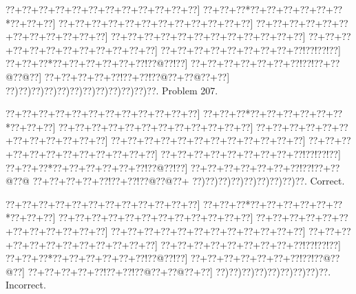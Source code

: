 \documentclass[a5paper]{article}
\begin{document}
\begin{center}
{\goo
\0??+\0??+\0??+\0??+\0??+\0??+\0??+\0??+\0??+\0??+\0??+\0??]
\0??+\0??+\0??*\0??+\0??+\0??+\0??+\0??+\0??*\0??+\0??+\0??]
\0??+\0??+\0??+\0??+\0??+\0??+\0??+\0??+\0??+\0??+\0??+\0??]
\0??+\0??+\0??+\0??+\0??+\0??+\0??+\0??+\0??+\0??+\0??+\0??]
\0??+\0??+\0??+\0??+\0??+\0??+\0??+\0??+\0??+\0??+\0??+\0??]
\0??+\0??+\0??+\0??+\0??+\0??+\0??+\0??+\0??+\0??+\0??+\0??]
\0??+\0??+\0??+\0??+\0??+\0??+\0??+\0??+\0??!\0??!\0??!\0??]
\0??+\0??+\0??*\0??+\0??+\0??+\0??+\0??+\0??!\0??@\0??!\0??]
\0??+\0??+\0??+\0??+\0??+\0??+\0??!\0??!\0??+\0??@\0??@\0??]
\0??+\0??+\0??+\0??+\0??!\0??+\0??!\0??@\0??+\0??@\0??+\0??]
\0??)\0??)\0??)\0??)\0??)\0??)\0??)\0??)\0??)\0??)\0??)\0??.
}
Problem 207.

\end{center}
\begin{center}
{\goo
\0??+\0??+\0??+\0??+\0??+\0??+\0??+\0??+\0??+\0??+\0??+\0??]
\0??+\0??+\0??*\0??+\0??+\0??+\0??+\0??+\0??*\0??+\0??+\0??]
\0??+\0??+\0??+\0??+\0??+\0??+\0??+\0??+\0??+\0??+\0??+\0??]
\0??+\0??+\0??+\0??+\0??+\0??+\0??+\0??+\0??+\0??+\0??+\0??]
\0??+\0??+\0??+\0??+\0??+\0??+\0??+\0??+\0??+\0??+\0??+\0??]
\0??+\0??+\0??+\0??+\0??+\0??+\0??+\0??+\0??+\0??+\0??+\0??]
\0??+\0??+\0??+\0??+\0??+\0??+\0??+\0??+\0??!\0??!\0??!\0??]
\0??+\0??+\0??*\0??+\0??+\0??+\0??+\0??+\0??!\0??@\0??!\0??]
\0??+\0??+\0??+\0??+\0??+\0??+\0??!\0??!\0??+\0??@\0??@
\0??+\0??+\0??+\0??+\0??!\0??+\0??!\0??@\0??@\0??+
\0??)\0??)\0??)\0??)\0??)\0??)\0??)\0??)\0??.
}
Correct. 

\end{center}
\begin{center}
{\goo
\0??+\0??+\0??+\0??+\0??+\0??+\0??+\0??+\0??+\0??+\0??+\0??]
\0??+\0??+\0??*\0??+\0??+\0??+\0??+\0??+\0??*\0??+\0??+\0??]
\0??+\0??+\0??+\0??+\0??+\0??+\0??+\0??+\0??+\0??+\0??+\0??]
\0??+\0??+\0??+\0??+\0??+\0??+\0??+\0??+\0??+\0??+\0??+\0??]
\0??+\0??+\0??+\0??+\0??+\0??+\0??+\0??+\0??+\0??+\0??+\0??]
\0??+\0??+\0??+\0??+\0??+\0??+\0??+\0??+\0??+\0??+\0??+\0??]
\0??+\0??+\0??+\0??+\0??+\0??+\0??+\0??+\0??!\0??!\0??!\0??]
\0??+\0??+\0??*\0??+\0??+\0??+\0??+\0??+\0??!\0??@\0??!\0??]
\0??+\0??+\0??+\0??+\0??+\0??+\0??!\0??!\0??@\0??@\0??]
\0??+\0??+\0??+\0??+\0??!\0??+\0??!\0??@\0??+\0??@\0??+\0??]
\0??)\0??)\0??)\0??)\0??)\0??)\0??)\0??)\0??.
}
Incorrect. 

\end{center}
\newpage
\end{document}
